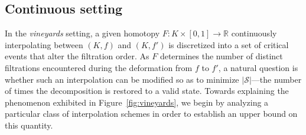 \documentclass[sn-mathphys]{sn-jnl}
\begin{document}
\subsection{Continuous setting}\label{sec:continuous_setting}
In the \emph{vineyards} setting, a given homotopy  $F : K \times [0,1] \to \mathbb{R}$ continuously interpolating between $(K, f)$ and $(K, f')$ is discretized into a set of critical events that alter the filtration order. 
As $F$ determines the number of distinct filtrations encountered during the deformation from $f$ to $f'$, a natural question is whether such an interpolation can be modified so as to minimize $\lvert \mathcal{S}\rvert$---the number of times the decomposition is restored to a valid state.
Towards explaining the phenomenon exhibited in Figure~\ref{fig:vineyards}, we begin by analyzing a particular class of interpolation schemes in order to establish an upper bound on this quantity.

\end{document}
